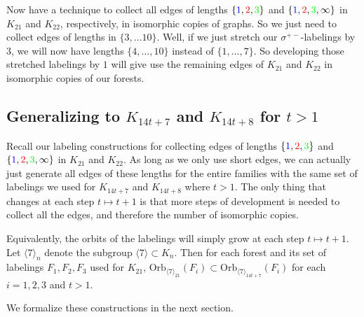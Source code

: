   Now have a technique to collect all edges of lengths $\{\textcolor{blue}{1},\textcolor{red}{2},\textcolor{green}{3}\}$ and $\{\textcolor{blue}{1},\textcolor{red}{2},\textcolor{green}{3},\infty\}$ in $K_{21}$ and $K_{22}$, respectively, in isomorphic copies of graphs. So we just need to collect edges of lengths in $\{3,\hdots 10\}$. Well, if we just stretch our $\sigma^{+-}$-labelings by $3$, we will now have lengths $\{4,\hdots,10\}$ instead of $\{1,\hdots,7\}$. So developing those stretched labelings by $1$ will give use the remaining edges of $K_{21}$ and $K_{22}$ in isomorphic copies of our forests.
  \subsection{Generalizing to $K_{14t+7}$ and $K_{14t+8}$ for $t>1$}\label{sec:7,8constrgen}

  Recall our labeling constructions for collecting edges of lengths $\{\textcolor{blue}{1},\textcolor{red}{2},\textcolor{green}{3}\}$ and $\{\textcolor{blue}{1},\textcolor{red}{2},\textcolor{green}{3},\infty\}$ in $K_{21}$ and $K_{22}$. As long as we only use short edges, we can actually just generate all edges of these lengths for the entire families with the same set of labelings we used for $K_{14t+7}$ and $K_{14t+8}$ where $t>1$. The only thing that changes at each step $t\mapsto t+1$ is that more steps of development is needed to collect all the edges, and therefore the number of isomorphic copies.
  
  Equivalently, the orbits of the labelings will simply grow at each step $t\mapsto t+1$. Let $\langle 7\rangle_{n}$ denote the subgroup $\langle 7\rangle\subset K_{n}$. Then for each forest and its set of labelings $F_{1},F_{2},F_{3}$ used for $K_{21}$, $\mathrm{Orb}_{\langle 7\rangle_{21}}(F_{i})\subset \mathrm{Orb}_{\langle 7\rangle_{14t+7}}(F_{i})$ for each $i=1,2,3$ and $t>1$.\newline

 We formalize these constructions in the next section.
